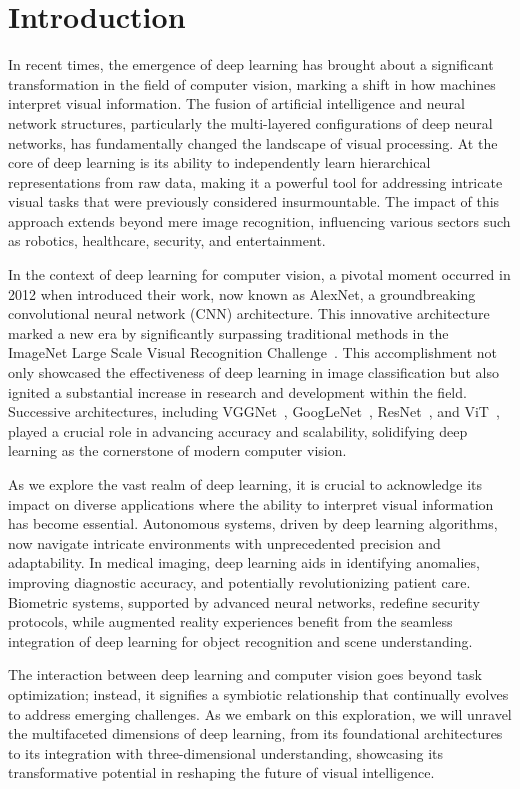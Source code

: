 \chapter{Introduction}

In recent times, the emergence of deep learning has brought about a significant transformation in the field of computer vision, marking a shift in how machines interpret visual information. The fusion of artificial intelligence and neural network structures, particularly the multi-layered configurations of deep neural networks, has fundamentally changed the landscape of visual processing. At the core of deep learning is its ability to independently learn hierarchical representations from raw data, making it a powerful tool for addressing intricate visual tasks that were previously considered insurmountable. The impact of this approach extends beyond mere image recognition, influencing various sectors such as robotics, healthcare, security, and entertainment.

In the context of deep learning for computer vision, a pivotal moment occurred in 2012 when \cite{krizhevsky2012imagenet} introduced their work, now known as AlexNet, a groundbreaking convolutional neural network (CNN) architecture. This innovative architecture marked a new era by significantly surpassing traditional methods in the ImageNet Large Scale Visual Recognition Challenge~\citep{ILSVRC15}. This accomplishment not only showcased the effectiveness of deep learning in image classification but also ignited a substantial increase in research and development within the field. Successive architectures, including VGGNet~\citep{Simonyan15}, GoogLeNet~\citep{szegedy2015going}, ResNet~\citep{he2016deep}, and ViT~\citep{dosovitskiy2020image}, played a crucial role in advancing accuracy and scalability, solidifying deep learning as the cornerstone of modern computer vision.

As we explore the vast realm of deep learning, it is crucial to acknowledge its impact on diverse applications where the ability to interpret visual information has become essential. Autonomous systems, driven by deep learning algorithms, now navigate intricate environments with unprecedented precision and adaptability. In medical imaging, deep learning aids in identifying anomalies, improving diagnostic accuracy, and potentially revolutionizing patient care. Biometric systems, supported by advanced neural networks, redefine security protocols, while augmented reality experiences benefit from the seamless integration of deep learning for object recognition and scene understanding.

The interaction between deep learning and computer vision goes beyond task optimization; instead, it signifies a symbiotic relationship that continually evolves to address emerging challenges. As we embark on this exploration, we will unravel the multifaceted dimensions of deep learning, from its foundational architectures to its integration with three-dimensional understanding, showcasing its transformative potential in reshaping the future of visual intelligence.